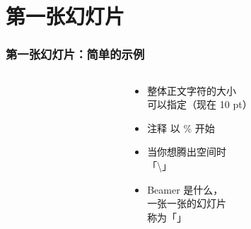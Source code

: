 \section{第一张幻灯片}

\begin{frame}[fragile]
  \frametitle{第一张幻灯片：简单的示例}
  \begin{columns}
    \begin{column}{0.55\textwidth}
      
    \end{column}
    \begin{column}{0.45\textwidth}
      \begin{itemize}
        \item
        整体正文字符的大小\\
        可以指定{\footnotesize （现在 10 pt）}
        \item
          注释 \alert{以 \% 开始}
        \item
          当你想腾出空间时\\
          「\textbackslash\textvisiblespace」
        \item
        Beamer 是什么，\\
        一张一张的幻灯片\\
        称为「」
      \end{itemize}
    \end{column}
  \end{columns}

\end{frame}

